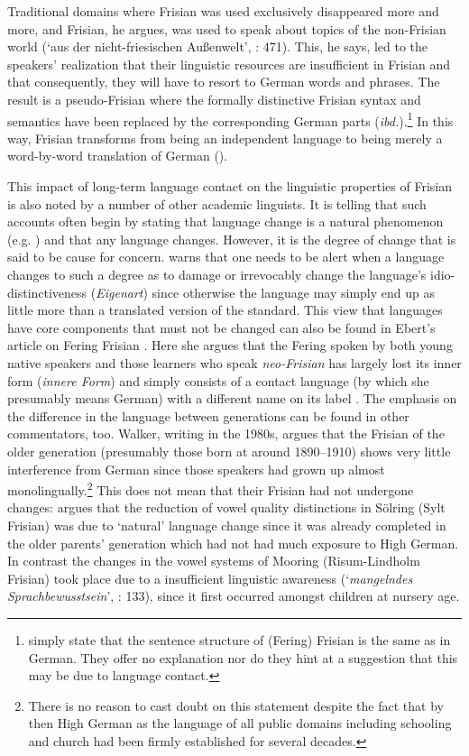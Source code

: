 \documentclass[output=paper]{langsci/langscibook}
\begin{document}
Traditional domains where Frisian was used exclusively disappeared more and more, and Frisian, he argues, was used to speak about topics of the non-Frisian world (‘aus der nicht-friesischen Außenwelt’, \citealt{Sjolin1997}: 471). This, he says, led to the speakers’ realization that their linguistic resources are insufficient in Frisian and that consequently, they will have to resort to German words and phrases. The result is a pseudo-Frisian where the formally distinctive Frisian syntax and semantics have been replaced by the corresponding German parts (\textit{ibd.}).\footnote{\citet[33]{SchmidtCraigie1928} simply state that the sentence structure of (Fering) Frisian is the same as in German. They offer no explanation nor do they hint at a suggestion that this may be due to language contact.} In this way, Frisian transforms from being an independent language to being merely a word-by-word translation of German (\citealt{Ebert1994}). 

This impact of long-term language contact on the linguistic properties of Frisian is also noted by a number of other academic linguists. It is telling that such accounts often begin by stating that language change is a natural phenomenon (e.g. \citealt{Walker1979, Ebert1994}) and that any language changes. However, it is the degree of change that is said to be cause for concern. \citet[53]{Walker1979} warns that one needs to be alert when a language changes to such a degree as to damage or irrevocably change the language’s idio-distinctiveness (\textit{Eigenart}) since otherwise the language may simply end up as little more than a translated version of the standard. This view that languages have core components that must not be changed can also be found in Ebert’s article on Fering Frisian \citep{Ebert1994}. Here she argues that the Fering spoken by both young native speakers and those learners who speak \textit{neo-Frisian} has largely lost its inner form (\textit{innere Form}) and simply consists of a contact language (by which she presumably means German) with a different name on its label \citep[25]{Ebert1994}. The emphasis on the difference in the language between generations can be found in other commentators, too. Walker, writing in the 1980s, argues that the Frisian of the older generation (presumably those born at around 1890--1910) shows very little interference from German since those speakers had grown up almost monolingually.\footnote{There is no reason to cast doubt on this statement despite the fact that by then High German as the language of all public domains including schooling and church had been firmly established for several decades.} This does not mean that their Frisian had not undergone changes: \citet[113]{Walker1978} argues that the reduction of vowel quality distinctions in Sölring (Sylt Frisian) was due to ‘natural’ language change since it was already completed in the older parents’ generation which had not had much exposure to High German. In contrast the changes in the vowel systems of Mooring (Risum-Lindholm Frisian) took place due to a insufficient linguistic awareness (‘\textit{mangelndes Sprachbewusstsein}’, \citealt{Walker1978}: 133), since it first occurred amongst children at nursery age. 
\end{document}
